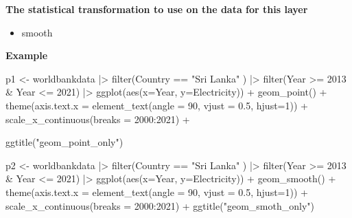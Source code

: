 \documentclass[
  letterpaper,
  DIV=11,
  numbers=noendperiod]{scrreprt}
\newenvironment{Shaded}{\begin{snugshade}}{\end{snugshade}}
\newcommand{\AttributeTok}[1]{\textcolor[rgb]{0.40,0.45,0.13}{#1}}
\newcommand{\DecValTok}[1]{\textcolor[rgb]{0.68,0.00,0.00}{#1}}
\newcommand{\FloatTok}[1]{\textcolor[rgb]{0.68,0.00,0.00}{#1}}
\newcommand{\FunctionTok}[1]{\textcolor[rgb]{0.28,0.35,0.67}{#1}}
\newcommand{\NormalTok}[1]{\textcolor[rgb]{0.00,0.23,0.31}{#1}}
\newcommand{\OtherTok}[1]{\textcolor[rgb]{0.00,0.23,0.31}{#1}}
\newcommand{\SpecialCharTok}[1]{\textcolor[rgb]{0.37,0.37,0.37}{#1}}
\newcommand{\StringTok}[1]{\textcolor[rgb]{0.13,0.47,0.30}{#1}}
\providecommand{\tightlist}{%
  \setlength{\itemsep}{0pt}\setlength{\parskip}{0pt}}\usepackage{longtable,booktabs,array}
\begin{document}
\textbf{The statistical transformation to use on the data for this
layer}

\begin{itemize}
\tightlist
\item
  smooth
\end{itemize}

\textbf{Example}

\begin{Shaded}
\begin{Highlighting}[]
\NormalTok{p1 }\OtherTok{\textless{}{-}}\NormalTok{ worldbankdata }\SpecialCharTok{|\textgreater{}}
  \FunctionTok{filter}\NormalTok{(Country }\SpecialCharTok{==} \StringTok{"Sri Lanka"}\NormalTok{ ) }\SpecialCharTok{|\textgreater{}}
  \FunctionTok{filter}\NormalTok{(Year }\SpecialCharTok{\textgreater{}=} \DecValTok{2013} \SpecialCharTok{\&}\NormalTok{ Year }\SpecialCharTok{\textless{}=} \DecValTok{2021}\NormalTok{) }\SpecialCharTok{|\textgreater{}} 
  \FunctionTok{ggplot}\NormalTok{(}\FunctionTok{aes}\NormalTok{(}\AttributeTok{x=}\NormalTok{Year, }\AttributeTok{y=}\NormalTok{Electricity)) }\SpecialCharTok{+} 
  \FunctionTok{geom\_point}\NormalTok{() }\SpecialCharTok{+}
  \FunctionTok{theme}\NormalTok{(}\AttributeTok{axis.text.x =} \FunctionTok{element\_text}\NormalTok{(}\AttributeTok{angle =} \DecValTok{90}\NormalTok{, }\AttributeTok{vjust =} \FloatTok{0.5}\NormalTok{, }\AttributeTok{hjust=}\DecValTok{1}\NormalTok{)) }\SpecialCharTok{+} 
  \FunctionTok{scale\_x\_continuous}\NormalTok{(}\AttributeTok{breaks =} \DecValTok{2000}\SpecialCharTok{:}\DecValTok{2021}\NormalTok{)  }\SpecialCharTok{+} 

  \FunctionTok{ggtitle}\NormalTok{(}\StringTok{"geom\_point\_only"}\NormalTok{)}

\NormalTok{p2 }\OtherTok{\textless{}{-}}\NormalTok{ worldbankdata }\SpecialCharTok{|\textgreater{}} 
  \FunctionTok{filter}\NormalTok{(Country }\SpecialCharTok{==} \StringTok{"Sri Lanka"}\NormalTok{ ) }\SpecialCharTok{|\textgreater{}}
  \FunctionTok{filter}\NormalTok{(Year }\SpecialCharTok{\textgreater{}=} \DecValTok{2013} \SpecialCharTok{\&}\NormalTok{ Year }\SpecialCharTok{\textless{}=} \DecValTok{2021}\NormalTok{) }\SpecialCharTok{|\textgreater{}}
  \FunctionTok{ggplot}\NormalTok{(}\FunctionTok{aes}\NormalTok{(}\AttributeTok{x=}\NormalTok{Year, }\AttributeTok{y=}\NormalTok{Electricity)) }\SpecialCharTok{+} 
  \FunctionTok{geom\_smooth}\NormalTok{() }\SpecialCharTok{+}
  \FunctionTok{theme}\NormalTok{(}\AttributeTok{axis.text.x =} \FunctionTok{element\_text}\NormalTok{(}\AttributeTok{angle =} \DecValTok{90}\NormalTok{, }\AttributeTok{vjust =} \FloatTok{0.5}\NormalTok{, }\AttributeTok{hjust=}\DecValTok{1}\NormalTok{)) }\SpecialCharTok{+} 
  \FunctionTok{scale\_x\_continuous}\NormalTok{(}\AttributeTok{breaks =} \DecValTok{2000}\SpecialCharTok{:}\DecValTok{2021}\NormalTok{)  }\SpecialCharTok{+} 
  \FunctionTok{ggtitle}\NormalTok{(}\StringTok{"geom\_smoth\_only"}\NormalTok{)}


\end{Highlighting}
\end{Shaded}
\end{document}
